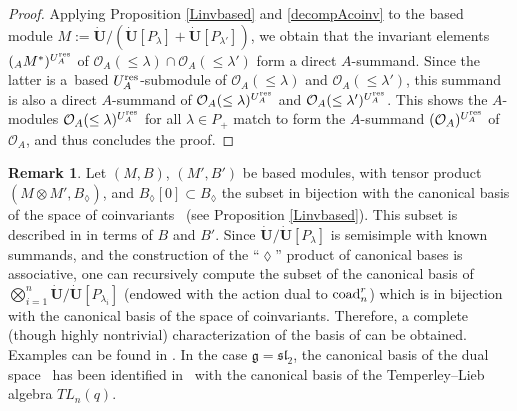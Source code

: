\documentclass[10pt,a4paper]{amsart}
\numberwithin{equation}{section}
\theoremstyle{definition}
\newtheorem{Remark}[teo]{Remark}
\newcommand{\Oo}{{\mathcal O}}
\begin{document}
\begin{proof}
 Applying Proposition \ref{Linvbased} and \eqref{decompAcoinv} to the based module $M:=\dot{\mathbf{U}} /(\dot{\mathbf{U}} [P_\lambda]+ \dot{\mathbf{U}} [P_{\lambda'}])$, we obtain that the invariant elements $({}_A M^*)^{U_A^{\rm res}}$ of $\Oo_A(\leq \lambda) \cap \Oo_A(\leq \lambda')$ form a direct $A$-summand. Since the latter is a~based $U_A^{\rm res}$-submodule of $ \Oo_A(\leq \lambda)$ and $\Oo_A(\leq \lambda')$, this summand is also a direct $A$-summand of $ \Oo_A(\leq \lambda)^{U_A^{\rm res}}$ and $\Oo_A(\leq \lambda')^{U_A^{\rm res}}$. This shows the $A$-modules $ \Oo_A(\leq \lambda)^{U_A^{\rm res}}$ for all $\lambda\in P_+$ match to form the $A$-summand $(\Oo_A)^{U_A^{\rm res}}$ of $\Oo_A$, and thus concludes the proof.
 \end{proof}

\begin{Remark} Let $(M,B)$, $(M', B')$ be based modules, with tensor product $(M\otimes M',B_{\lozenge})$, and $B_{\lozenge}[0]\subset B_{\lozenge}$ the subset in bijection with the canonical basis of the space of coinvariants~ (see Proposition \ref{Linvbased}). This subset is described in \cite[Proposition 27.3.8]{Lusztig} in terms of $B$ and $B'$. Since $\dot{\mathbf{U}} / \dot{\mathbf{U}} [P_{\lambda}]$ is semisimple with known summands, and the construction of the ``$\lozenge$'' product of canonical bases is associative, one can recursively compute the subset of the canonical basis of $\bigotimes_{i=1}^n \dot{\mathbf{U}} / \dot{\mathbf{U}} [P_{\lambda_i}]$ (endowed with the action dual to ${\rm coad}_n^r$) which is in bijection with the canonical basis of the space of coinvariants. Therefore, a complete (though highly nontrivial) characterization of the basis of \smash{$\big(\Oo_A^{\otimes n}\big)^{U_A^{\rm res}}$} can be obtained. Examples can be found in \cite[Section~27.3.10]{Lusztig}. In the case $\mathfrak{g}={\mathfrak{sl}_2}$, the canonical basis of the dual space~ has been identified in~\cite{FK} with the canonical basis of the Temperley--Lieb algebra $TL_n(q)$.
\end{Remark}
\end{document}
